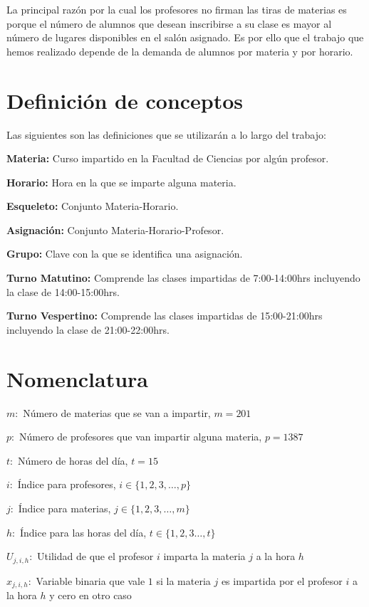 La principal razón por la cual los profesores no firman las tiras de materias es porque el número de alumnos que desean inscribirse a su clase es mayor al número de lugares disponibles en el salón asignado. Es por ello que el trabajo que hemos realizado depende de la demanda de alumnos por materia y por horario.



\section{Definición de conceptos}

Las siguientes son las definiciones que se utilizarán a lo largo del trabajo:
  
  \textbf{Materia:} Curso impartido en la Facultad de Ciencias por algún profesor.

\textbf{Horario:} Hora en la que se imparte alguna materia.

\textbf{Esqueleto:} Conjunto Materia-Horario.

\textbf{Asignación:} Conjunto Materia-Horario-Profesor.

\textbf{Grupo:} Clave con la que se identifica una asignación.

\textbf{Turno Matutino:} Comprende las clases impartidas de 7:00-14:00hrs incluyendo la clase de 14:00-15:00hrs.

\textbf{Turno Vespertino:} Comprende las clases impartidas de 15:00-21:00hrs incluyendo la clase de 21:00-22:00hrs.


\section{Nomenclatura}

$m:$ Número de materias que se van a impartir, $m = 201$
  
  $p:$ Número de profesores que van impartir alguna materia, $p = 1387$
  
  $t:$ Número de horas del día, $t = 15$
  
  $i:$ Índice para profesores, $i \in \{ 1, 2, 3, \ldots, p \}$
  
  $j:$ Índice para materias, $j \in \{ 1, 2, 3, \ldots, m \}$
  
  $h:$ Índice para las horas del día, $t \in \{ 1, 2, 3 \ldots, t\}$
  
  $U_{j,i,h}:$ Utilidad de que el profesor $i$ imparta la materia $j$ a la hora $h$
  
  $x_{j,i,h}:$ Variable binaria que vale $1$ si la materia $j$ es impartida por el profesor $i$ a la hora $h$ y cero en otro caso

